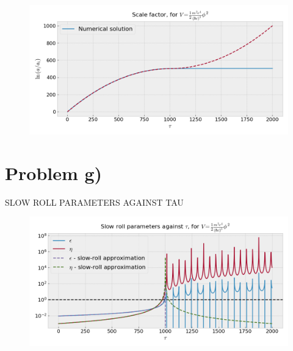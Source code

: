 \documentclass[reprint,english,notitlepage]{revtex4-1}  %
\numberwithin{equation}{section}
\begin{document}
\begin{figure}[h!]
	\includegraphics[width=\linewidth]{QuadraticPotential_scale-factor.png}
	\caption{}
	\label{fig:quad_a}
\end{figure}

\section{Problem g)}
SLOW ROLL PARAMETERS AGAINST TAU
\begin{figure}[h!]
	\includegraphics[width=\linewidth]{QuadraticPotential_slowroll-tau.png}
	\caption{}
	\label{}
\end{figure}
\end{document}
